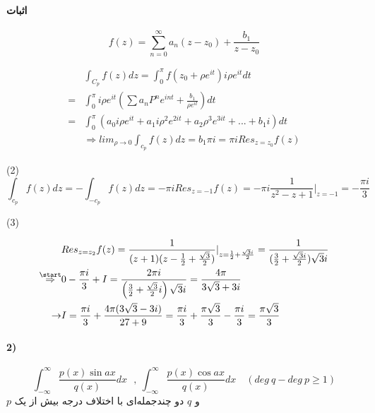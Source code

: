 \paragraph{اثبات}
\begin{equation*}
f(z) = \sum_{n=0}^{\infty} a_{n} (z-z_{0} ) + \frac {b_{1}}{z-z_{0}}
\end{equation*}
\begin{center}
\begin{align*}
&\int_{C_{p}} f(z) d z=\int_{0}^{\pi} f\left(z_{0}+\rho e^{i t}\right)i \rho e^{i t} d t
\\
=&\int_{0}^{\pi} i \rho e^{i t}\left(\sum a_{n} P^{n} e^{i n t}+\frac{b_{1}}{\rho e^{ i t}}\right) d t
\\
=&\int_{0}^{\pi} ( a_{0}i \rho e^{i  t} + a_{1}i \rho^{2} e^{2i  t} + a_{2} \rho^{3} e^{3i  t} + ... + b_{1} i )dt
\\
&\Rightarrow lim_{\rho \rightarrow 0} \int_{c_{p}} f(z)dz = b_{1}\pi i = \pi i Res_{z=z_{0}} f(z)
\end{align*}
\end{center}
\par{(2)}
\begin{equation*}
\int_{c_{p}} f(z)dz =-\int_{- c_{p}} f(z)dz=- \pi i Res_{z=-1} f(z)=- \pi i \frac {1}{z^{2}-z+1} |_{z=-1}=-\frac {\pi i}{3}
\end{equation*}
\par{(3)}
\begin{center}
\begin{align*}
 & Res_{ z=z_{2}}f(z) =\frac{1}{(z+1)(z-\frac{1}{2}+\frac { \sqrt{3} }{2})} |_{z=\frac{1}{2}+\frac { \sqrt{3} i}{2}}
=\frac {1}{(\frac{3}{2}+\frac { \sqrt{3} i}{2} )\sqrt{3} i}
\\
\overset{\start}{\Rightarrow}
 & 0-\frac{\pi i}{3}+I=\frac{2 \pi i}{\left(\frac{3}{2}+\frac{\sqrt{3}}{2} i\right) \sqrt{3} i}=\frac{4 \pi}{3 \sqrt{3}+3 i}
\\
\rightarrow & I=\frac{\pi i}{3}+\frac{4 \pi(3 \sqrt{3}-3 i)}{27+9}=\frac{\pi i}{3}+\frac{\pi \sqrt{3}}{3}-\frac{\pi i}{3}=\frac{\pi \sqrt{3}}{3}
\end{align*}
\end{center}
\newpage
\paragraph{2)}
\begin{equation*}
	\int_{-\infty}^{\infty} \frac {p(x) \sin ax }{q(x)} dx  \ \ \ , \ \int_{-\infty}^{\infty} \frac {p(x) \cos ax }{q(x)} dx \quad
(deg\ q - deg\ p \geq 1)
\end{equation*}
$p$ 
و 
$q$ 
دو چندجمله‌ای با اختلاف درجه بیش از یک

